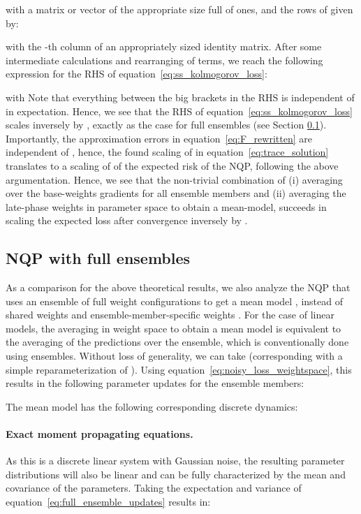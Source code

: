 \documentclass{article} \usepackage{iclr2021_conference,times}
\def\eqref#1{equation~\ref{#1}}
\begin{document}
with  a matrix or vector of the appropriate size full of ones,  and the rows of  given by:

with  the -th column of an appropriately sized identity matrix.
After some intermediate calculations and rearranging of terms, we reach the following expression for the RHS of \eqref{eq:ss_kolmogorov_loss}:

with 
Note that everything between the big brackets in the RHS is independent of  in expectation. Hence, we see that the RHS of \eqref{eq:ss_kolmogorov_loss} scales inversely by , exactly as the case for full ensembles (see Section \ref{sec:NQP_full_ensembles}). Importantly, the approximation errors in \eqref{eq:F_rewritten} are independent of , hence, the found scaling of  in \eqref{eq:trace_solution} translates to a scaling of  of the expected risk of the NQP, following the above argumentation. Hence, we see that the non-trivial combination of (i) averaging over the base-weights gradients for all ensemble members and (ii) averaging the late-phase weights  in parameter space to obtain a mean-model, succeeds in scaling the expected loss after convergence inversely by .


\subsection{NQP with full ensembles}\label{sec:NQP_full_ensembles}
As a comparison for the above theoretical results, we also analyze the NQP that uses an ensemble of  full weight configurations  to get a mean model , instead of shared weights  and ensemble-member-specific weights . For the case of linear models, the averaging in weight space to obtain a mean model is equivalent to the averaging of the predictions over the ensemble, which is conventionally done using ensembles. Without loss of generality, we can take  (corresponding with a simple reparameterization of ). Using \eqref{eq:noisy_loss_weightspace}, this results in the following parameter updates for the ensemble members:

The mean model  has the following corresponding discrete dynamics: 

\paragraph{Exact moment propagating equations.}
As this is a discrete linear system with Gaussian noise, the resulting parameter distributions will also be linear and can be fully characterized by the mean and covariance of the parameters. Taking the expectation and variance of \eqref{eq:full_ensemble_updates} results in: 
\end{document}
